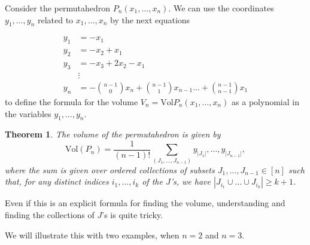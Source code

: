 \documentclass[english,11pt]{article}
\newtheorem{theorem}{Theorem}[section]
\theoremstyle{definition}
\theoremstyle{definition}
\theoremstyle{definition}
\theoremstyle{remark}
\theoremstyle{definition}
\begin{document}
Consider the permutahedron $P_n(x_1,\dots, x_n)$. We can use the coordinates $y_1, \dots, y_n$ related to $x_1,\dots, x_n$ by the next equations

    \begin{align*}
        y_1 &= -x_1\\
        y_2 &= -x_2+x_1\\
        y_3 &= -x_3+2x_2-x_1\\
        & \vdots\\
        y_n&= -\binom{n-1}{0}x_n + \binom{n-1}{1}x_{n-1}\dots+ \binom{n-1}{n-1}x_1
    \end{align*}
to define the formula for the volume $V_n= \text{Vol} P_n(x_1,\dots,x_n)$ as a polynomial in the variables $y_1,\dots, y_n$.


\begin{theorem}
The volume of the permutahedron is given by 
$$\text{Vol}( P_n )= \frac{1}{(n-1)!} \sum_{(J_1, \dots, J_{n-1})} y_{|J_1|}, \dots, y_{|J_{n-1}|},$$
where the sum is given over ordered collections of subsets $J_1, \dots, J_{n-1} \in [n]$ such that, for any distinct indices $i_1, \dots, i_k$ of the $J$'s, we have $|J_{i_1}\cup \ldots \cup J_{i_k}| \geq k+1$.
\end{theorem}

Even if this is an explicit formula for finding the volume, understanding and finding the collections of $J$'s is quite tricky.

We will illustrate this with two examples, when $n=2$ and $n=3$.
\end{document}
